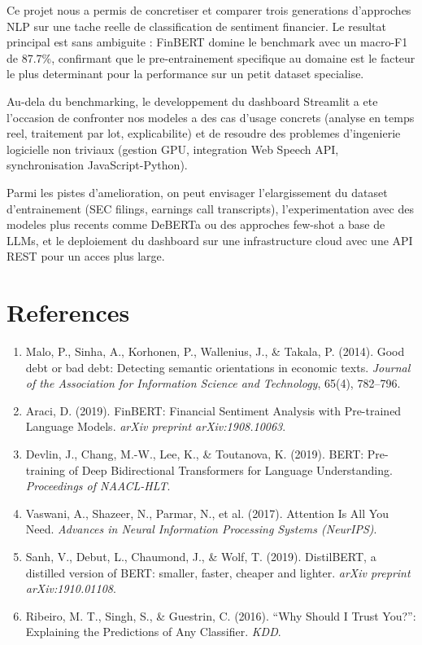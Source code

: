 \documentclass[12pt, a4paper]{article}
\begin{document}
Ce projet nous a permis de concretiser et comparer trois generations d'approches
NLP sur une tache reelle de classification de sentiment financier. Le resultat
principal est sans ambiguite : FinBERT domine le benchmark avec un macro-F1 de
87.7\%, confirmant que le pre-entrainement specifique au domaine est le facteur
le plus determinant pour la performance sur un petit dataset specialise.

Au-dela du benchmarking, le developpement du dashboard Streamlit a ete l'occasion
de confronter nos modeles a des cas d'usage concrets (analyse en temps reel,
traitement par lot, explicabilite) et de resoudre des problemes d'ingenierie
logicielle non triviaux (gestion GPU, integration Web Speech API, synchronisation
JavaScript-Python).

Parmi les pistes d'amelioration, on peut envisager l'elargissement du dataset
d'entrainement (SEC filings, earnings call transcripts), l'experimentation avec
des modeles plus recents comme DeBERTa ou des approches few-shot a base de LLMs,
et le deploiement du dashboard sur une infrastructure cloud avec une API REST
pour un acces plus large.

\section*{References}

\begin{enumerate}
  \item Malo, P., Sinha, A., Korhonen, P., Wallenius, J., \& Takala, P. (2014).
    Good debt or bad debt: Detecting semantic orientations in economic texts.
    \emph{Journal of the Association for Information Science and Technology},
    65(4), 782--796.
  \item Araci, D. (2019). FinBERT: Financial Sentiment Analysis with Pre-trained
    Language Models. \emph{arXiv preprint arXiv:1908.10063}.
  \item Devlin, J., Chang, M.-W., Lee, K., \& Toutanova, K. (2019). BERT:
    Pre-training of Deep Bidirectional Transformers for Language Understanding.
    \emph{Proceedings of NAACL-HLT}.
  \item Vaswani, A., Shazeer, N., Parmar, N., et al. (2017). Attention Is All
    You Need. \emph{Advances in Neural Information Processing Systems (NeurIPS)}.
  \item Sanh, V., Debut, L., Chaumond, J., \& Wolf, T. (2019). DistilBERT, a
    distilled version of BERT: smaller, faster, cheaper and lighter.
    \emph{arXiv preprint arXiv:1910.01108}.
  \item Ribeiro, M. T., Singh, S., \& Guestrin, C. (2016). ``Why Should I Trust
    You?'': Explaining the Predictions of Any Classifier. \emph{KDD}.
\end{enumerate}
\end{document}
